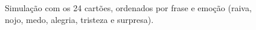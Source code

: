 \documentclass[a4paper,11pt,titlepage,singlespacing]{article}
\begin{document}
{    \begin{figure}
        \caption{Simulação com os 24 cartões, ordenados por frase e emoção (raiva, nojo, medo, alegria, tristeza e surpresa).}
        \label{fig:key}
    \end{figure}
    
    
}




\pagebreak


\end{document}
